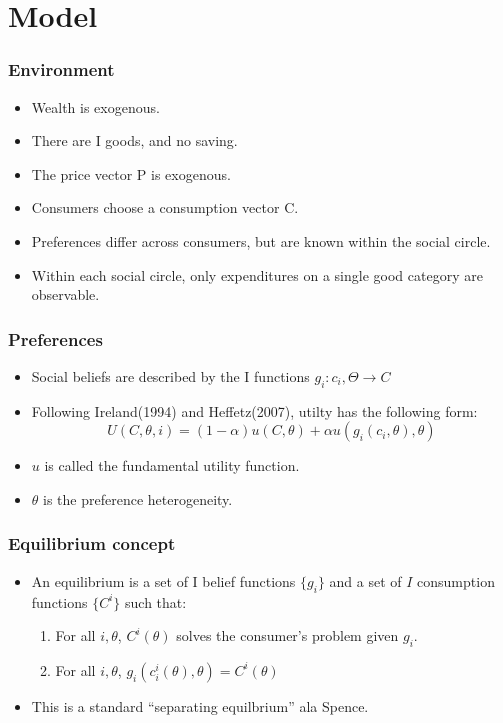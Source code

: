 \documentclass{beamer}
\begin{document}
\section{Model}
\begin{frame}
  \frametitle{Environment}
  \begin{itemize} 
    \item Wealth is exogenous.
    \item There are I goods, and no saving.
    \item The price vector P is exogenous.
    \item Consumers choose a consumption vector C.
    \item Preferences differ across consumers, but are known within the social circle.
    \item Within each social circle, only expenditures on a single good category are observable. 
  \end{itemize}
\end{frame}
% 
\begin{frame}
  \frametitle{Preferences}
   \begin{itemize} 
     \item Social beliefs are described by the I functions $g_i:c_i,\Theta \rightarrow C$
    \item Following Ireland(1994) and Heffetz(2007), utilty has the following form:
      \[
	U(C,\theta,i) = (1-\alpha) u(C,\theta) + \alpha u(g_i(c_i,\theta),\theta)
      \]
    \item $u$ is called the fundamental utility function.
    \item $\theta$ is the preference heterogeneity.
  \end{itemize}
\end{frame}
%
\begin{frame}
  \frametitle{Equilibrium concept}
   \begin{itemize} 
     \item An equilibrium is a set of I belief functions $\{g_i\}$ and a set of $I$ consumption functions $\{C^i\}$ such that:  
       \begin{enumerate}
	 \item For all $i,\theta$, $C^i(\theta)$ solves the consumer's problem given $g_i$. 
	 \item For all $i,\theta$, $g_i(c_i^i(\theta),\theta) = C^i(\theta)$
       \end{enumerate}
     \item This is a standard ``separating equilbrium'' ala Spence.
  \end{itemize}
\end{frame}
\end{document}
